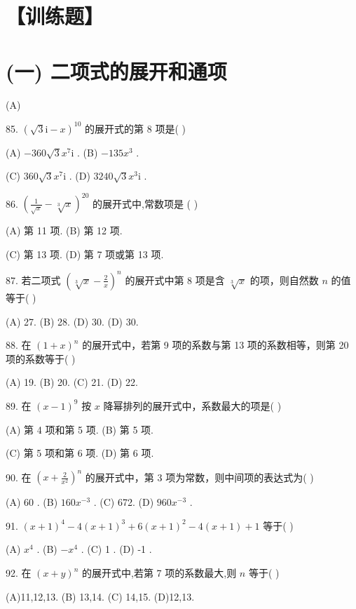 \documentclass[10pt]{article}
\begin{document}
\section*{【训练题】}

\section*{(一) 二项式的展开和通项}

(A)

85. \({\left( \sqrt{3}\mathrm{i} - x\right) }^{10}\) 的展开式的第 8 项是( )

(A) \(- {360}\sqrt{3}{x}^{7}\mathrm{i}\) . (B) \(- {135}{x}^{3}\) .

(C) \({360}\sqrt{3}{x}^{7}\mathrm{i}\) . (D) \({3240}\sqrt{3}{x}^{3}\mathrm{i}\) .

86. \({\left( \frac{1}{\sqrt{x}} - \sqrt[3]{x}\right) }^{20}\) 的展开式中,常数项是 ( )

(A) 第 11 项. (B) 第 12 项.

(C) 第 13 项. (D) 第 7 项或第 13 项.

87. 若二项式 \({\left( \sqrt[3]{x} - \frac{2}{x}\right) }^{n}\) 的展开式中第 8 项是含 \(\sqrt[3]{x}\) 的项，则自然数 \(n\) 的值等于( )

(A) 27. (B) 28. (D) 30. (D) 30.

88. 在 \({\left( 1 + x\right) }^{n}\) 的展开式中，若第 9 项的系数与第 13 项的系数相等，则第 20 项的系数等于( )

(A) 19. (B) 20. (C) 21. (D) 22.

89. 在 \({\left( x - 1\right) }^{9}\) 按 \(x\) 降幂排列的展开式中，系数最大的项是( )

(A) 第 4 项和第 5 项. (B) 第 5 项.

(C) 第 5 项和第 6 项. (D) 第 6 项.

90. 在 \({\left( x + \frac{2}{{x}^{2}}\right) }^{n}\) 的展开式中，第 3 项为常数，则中间项的表达式为( )

(A) 60 . (B) \({160}{x}^{-3}\) . (C) 672. (D) \({960}{x}^{-3}\) .

91. \({\left( x + 1\right) }^{4} - 4{\left( x + 1\right) }^{3} + 6{\left( x + 1\right) }^{2} - 4\left( {x + 1}\right)  + 1\) 等于( )

(A) \({x}^{4}\) . (B) \(- {x}^{4}\) . (C) 1 . (D) -1 .

92. 在 \({\left( x + y\right) }^{n}\) 的展开式中,若第 7 项的系数最大,则 \(n\) 等于( )

(A)11,12,13. (B) 13,14. (C) 14,15. (D)12,13.
\end{document}
